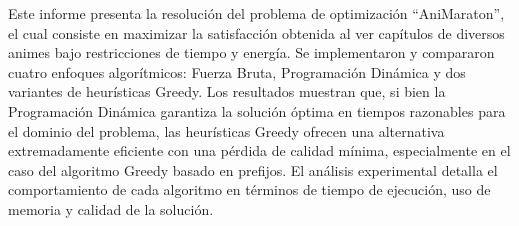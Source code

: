Este informe presenta la resolución del problema de optimización ``AniMaraton'', el cual consiste en maximizar la satisfacción obtenida al ver capítulos de diversos animes bajo restricciones de tiempo y energía. Se implementaron y compararon cuatro enfoques algorítmicos: Fuerza Bruta, Programación Dinámica y dos variantes de heurísticas Greedy. Los resultados muestran que, si bien la Programación Dinámica garantiza la solución óptima en tiempos razonables para el dominio del problema, las heurísticas Greedy ofrecen una alternativa extremadamente eficiente con una pérdida de calidad mínima, especialmente en el caso del algoritmo Greedy basado en prefijos. El análisis experimental detalla el comportamiento de cada algoritmo en términos de tiempo de ejecución, uso de memoria y calidad de la solución.
